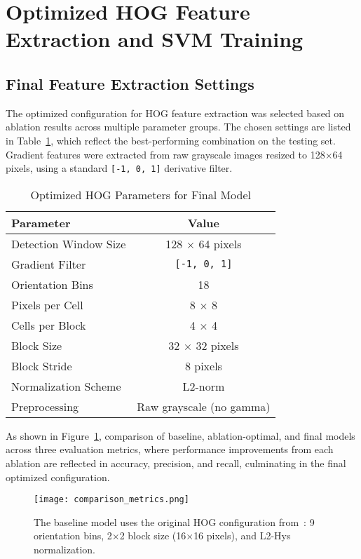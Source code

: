 \documentclass[10pt, onecolumn, a4paper]{article}
\begin{document}
\vspace{0.5em}
\section{Optimized HOG Feature Extraction and SVM Training}
\vspace{0.5em}

\subsection{Final Feature Extraction Settings}
\vspace{-0.5em}
The optimized configuration for HOG feature extraction was selected based on ablation results across multiple parameter groups. 
The chosen settings are listed in Table~\ref{tab:hogparams}, which reflect the best-performing combination on the testing set. 
Gradient features were extracted from raw grayscale images resized to 128$\times$64 pixels, using a standard \verb|[-1, 0, 1]| derivative filter.

\begin{table}[H]
\centering
\caption{Optimized HOG Parameters for Final Model}
\label{tab:hogparams}
\begin{tabular}{|l|c|}
\hline
\textbf{Parameter}              & \textbf{Value}           \\ \hline
Detection Window Size          & 128 $\times$ 64 pixels   \\ \hline
Gradient Filter                & \verb|[-1, 0, 1]|         \\ \hline
Orientation Bins               & 18                        \\ \hline
Pixels per Cell                & 8 $\times$ 8              \\ \hline
Cells per Block                & 4 $\times$ 4              \\ \hline
Block Size                     & 32 $\times$ 32 pixels     \\ \hline
Block Stride                   & 8 pixels                  \\ \hline
Normalization Scheme           & L2-norm                   \\ \hline
Preprocessing                  & Raw grayscale (no gamma)  \\ \hline
\end{tabular}
\end{table}

As shown in Figure~\ref{fig:metrics}, comparison of baseline, ablation-optimal, and final models across three evaluation metrics, 
where performance improvements from each ablation are reflected in accuracy, precision, and recall, culminating in the final optimized configuration.
\begin{figure}[H]
\centering
\texttt{[image: comparison\_metrics.png]}
\caption{\footnotesize The baseline model uses the original HOG configuration from~\cite{1467360}: 
9 orientation bins, 2$\times$2 block size (16$\times$16 pixels), 
and L2-Hys normalization.}
\label{fig:metrics}
\end{figure}
\vspace{-0.5em}
\end{document}
